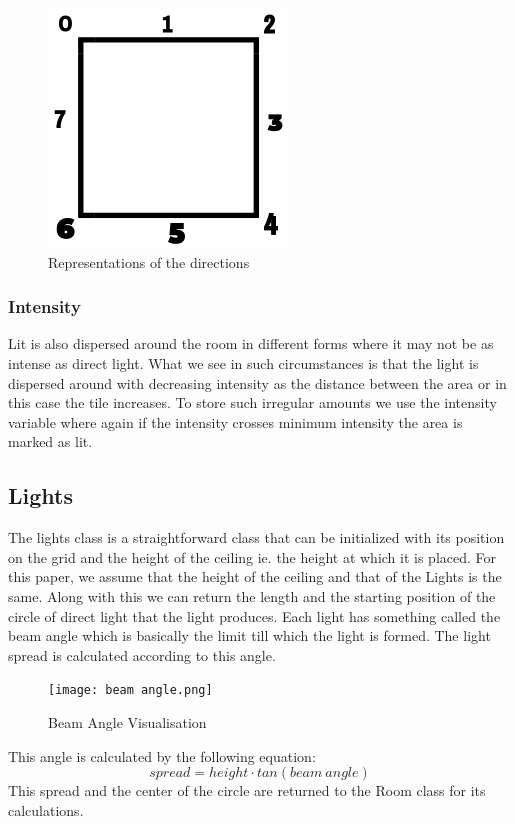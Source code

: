 \documentclass[conference]{IEEEtran}
\begin{document}
\begin{figure}
    \centering
    \includegraphics{Untitled design (2).png}
    \caption{Representations of the directions}
    \label{fig:fill_vessel}
\end{figure}
\subsubsection{Intensity}
Lit is also dispersed around the room in different forms where it may not be as intense as direct light. What we see in such circumstances is that the light is dispersed around with decreasing intensity as the distance between the area or in this case the tile increases. To store such irregular amounts we use the intensity variable where again if the intensity crosses minimum intensity the area is marked as lit. 
\subsection{Lights}
The lights class is a straightforward class that can be initialized with its position on the grid and the height of the ceiling ie. the height at which it is placed. For this paper, we assume that the height of the ceiling and that of the Lights is the same. Along with this we can return the length and the starting position of the circle of direct light that the light produces. Each light has something called the beam angle which is basically the limit till which the light is formed. %
The light spread is calculated according to this angle. 
\begin{figure}
    \centering
    \texttt{[image: beam angle.png]}
    \caption{Beam Angle Visualisation}
    \label{fig:fill_vessel}
\end{figure}

This angle is calculated by the following equation:
\begin{equation*}
    spread = height \cdot tan(beam\ angle)
\end{equation*}
This spread and the center of the circle are returned to the Room class for its calculations. 
\end{document}

